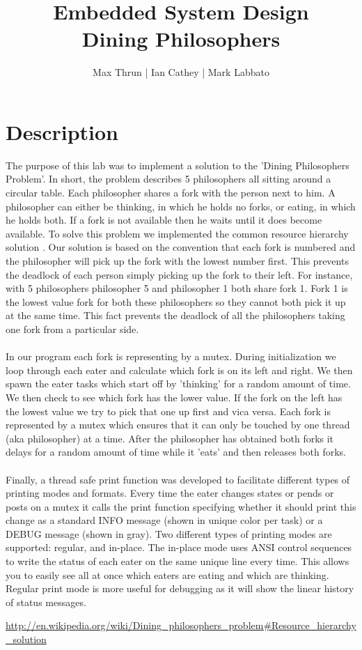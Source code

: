 \documentclass[12pt]{article}
\title{Embedded System Design \\ Dining Philosophers}
\author{ Max Thrun | Ian Cathey | Mark Labbato }
\begin{document}
\maketitle

\section*{Description}

The purpose of this lab was to implement a solution to the
'Dining Philosophers Problem'. In short, the problem describes
5 philosophers all sitting around a circular table. Each philosopher
shares a fork with the person next to him. A philosopher can either
be thinking, in which he holds no forks, or eating, in which he holds
both. If a fork is not available then he waits until it
does become available. To solve this problem we implemented the common
resource hierarchy solution \cite{sol}. Our solution is based on the
convention that each fork is numbered and the philosopher will pick up
the fork with the lowest number first. This prevents the deadlock of each
person simply picking up the fork to their left. For instance, with 5
philosophers philosopher 5 and philosopher 1 both share fork 1. Fork 1
is the lowest value fork for both these philosophers so they cannot both
pick it up at the same time. This fact prevents the deadlock of all the
philosophers taking one fork from a particular side.
\\\\
In our program each fork is representing by a mutex. During initialization 
we loop through each eater and calculate which fork is on its left and right. 
We then spawn the eater tasks which start off by 'thinking' for a random amount of
time. We then check to see which fork has the lower value. If the fork on the
left has the lowest value we try to pick that one up first and vica versa.
Each fork is represented by a mutex which ensures that it can only be touched
by one thread (aka philosopher) at a time. After the philosopher has obtained both
forks it delays for a random amount of time while it 'eats' and then releases
both forks.
\\\\
Finally, a thread safe print function was developed to facilitate different types of printing
modes and formats. Every time the eater changes states or pends or posts on a mutex it calls
the print function specifying whether it should print this change as a standard INFO message
(shown in unique color per task) or a DEBUG message (shown in gray). Two different types of 
printing modes are supported: regular, and in-place.  The in-place mode uses ANSI control 
sequences to write the status of each eater on the same unique line every time. This allows 
you to easily see all at once which eaters are eating and which are thinking. Regular print mode 
is more useful for debugging as it will show the linear history of status messages.

\begin{thebibliography}{9}
     \url{http://en.wikipedia.org/wiki/Dining_philosophers_problem#Resource_hierarchy_solution}
\end{thebibliography}
\end{document}
